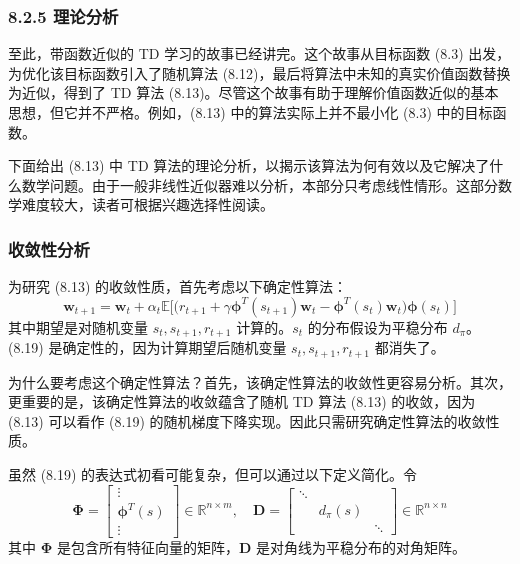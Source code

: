 \documentclass[UTF8]{article}
\begin{document}
\subsubsection*{8.2.5 理论分析}

至此，带函数近似的 TD 学习的故事已经讲完。这个故事从目标函数 (8.3) 出发，为优化该目标函数引入了随机算法 (8.12)，最后将算法中未知的真实价值函数替换为近似，得到了 TD 算法 (8.13)。尽管这个故事有助于理解价值函数近似的基本思想，但它并不严格。例如，(8.13) 中的算法实际上并不最小化 (8.3) 中的目标函数。

下面给出 (8.13) 中 TD 算法的理论分析，以揭示该算法为何有效以及它解决了什么数学问题。由于一般非线性近似器难以分析，本部分只考虑线性情形。这部分数学难度较大，读者可根据兴趣选择性阅读。

\subsubsection*{收敛性分析}

为研究 (8.13) 的收敛性质，首先考虑以下确定性算法：
\begin{equation}
\label{eq:det_td}
\boldsymbol{w}_{t+1} = \boldsymbol{w}_t + \alpha_t \mathbb{E}\Big[\big(r_{t+1} + \gamma \boldsymbol{\phi}^T(s_{t+1})\boldsymbol{w}_t - \boldsymbol{\phi}^T(s_t)\boldsymbol{w}_t\big) \boldsymbol{\phi}(s_t)\Big]
\end{equation}
其中期望是对随机变量 $s_t, s_{t+1}, r_{t+1}$ 计算的。$s_t$ 的分布假设为平稳分布 $d_\pi$。(8.19) 是确定性的，因为计算期望后随机变量 $s_t, s_{t+1}, r_{t+1}$ 都消失了。

为什么要考虑这个确定性算法？首先，该确定性算法的收敛性更容易分析。其次，更重要的是，该确定性算法的收敛蕴含了随机 TD 算法 (8.13) 的收敛，因为 (8.13) 可以看作 (8.19) 的随机梯度下降实现。因此只需研究确定性算法的收敛性质。

虽然 (8.19) 的表达式初看可能复杂，但可以通过以下定义简化。令
\begin{equation}
\label{eq:Phi_D}
\boldsymbol{\Phi} = \begin{bmatrix} \vdots \\ \boldsymbol{\phi}^T(s) \\ \vdots \end{bmatrix} \in \mathbb{R}^{n \times m},\quad
\boldsymbol{D} = \begin{bmatrix} \ddots & & \\ & d_\pi(s) & \\ & & \ddots \end{bmatrix} \in \mathbb{R}^{n \times n}
\end{equation}
其中 $\boldsymbol{\Phi}$ 是包含所有特征向量的矩阵，$\boldsymbol{D}$ 是对角线为平稳分布的对角矩阵。
\end{document}
